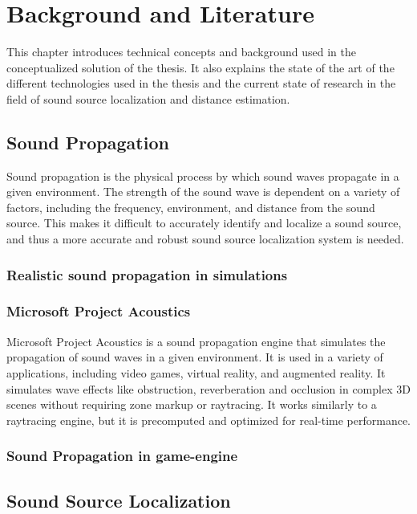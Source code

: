 \chapter{Background and Literature}
\label{ch:background}

This chapter introduces technical concepts and background used in the conceptualized solution of the thesis. It also explains the state of the art of the different technologies used in the thesis and the current state of research in the field of sound source localization and distance estimation.

\section{Sound Propagation}

Sound propagation is the physical process by which sound waves propagate in a given environment. The strength of the sound wave is dependent on a variety of factors, including the frequency, environment, and distance from the sound source. This makes it difficult to accurately identify and localize a sound source, and thus a more accurate and robust sound source localization system is needed.

\subsection{Realistic sound propagation in simulations}

\subsection{Microsoft Project Acoustics}

Microsoft Project Acoustics is a sound propagation engine that simulates the propagation of sound waves in a given environment. It is used in a variety of applications, including video games, virtual reality, and augmented reality. It simulates wave effects like obstruction, reverberation and occlusion in complex 3D scenes without requiring zone markup or raytracing. It works similarly to a raytracing engine, but it is precomputed and optimized for real-time performance. 

\subsection{Sound Propagation in game-engine}

\section{Sound Source Localization}

